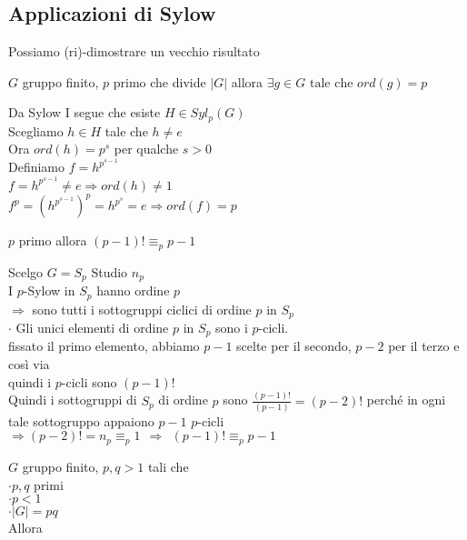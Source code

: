 \documentclass[12px]{article}
\begin{document}
\begin{dimo}
	\subsection{Applicazioni di Sylow}
	Possiamo (ri)-dimostrare un vecchio risultato
	\begin{teo}[Cauchy]
		$G$ gruppo finito, $p$ primo che divide $|G|$ allora 
			 $\exists g\in G\text{ tale che } ord(g) = p$
		
	\end{teo}
	\begin{dimo}
		Da Sylow I segue che esiste $H\in Syl_p(G)$ \\
		Scegliamo $h\in H$ tale che  $h\neq e$\\
		Ora  $ord(h) = p^s$ per qualche $s>0$\\
		Definiamo $f = h^{p^{s-1}}$\\
		 $f = h^{p^{s-1}}\neq e \Rightarrow ord(h)\neq 1$ \\
		 $f^p = (h^{p^{s-1}})^p = h^{p^s} = e \Rightarrow ord(f) = p$
	\end{dimo}
	\begin{teo}[Wilson]
		$p$ primo allora $(p-1)!\equiv_p p-1$
	\end{teo}
	\begin{dimo}
		Scelgo $G= S_p$ Studio $n_p$\\
		I  $p$-Sylow in $S_p$ hanno ordine $p$\\
		 $ \Rightarrow$ sono tutti i sottogruppi ciclici di ordine $p$ in $S_p$\\
		 $\cdot$ Gli unici elementi di ordine  $p$ in $S_p$ sono i $p$-cicli.\\
		 fissato il primo elemento, abbiamo $p-1$ scelte per il secondo, $p-2$ per il terzo e così via\\
		 quindi i $p$-cicli sono $ (p-1)!$\\
		 Quindi i sottogruppi di $S_p$ di ordine $p$ sono $\frac{(p-1)!}{(p-1)} = (p-2)!$ perché in ogni tale sottogruppo appaiono  $p-1$ $p$-cicli\\
		 $ \Rightarrow (p-2)! = n_p \equiv_p 1 \ \ \Rightarrow \ \ (p-1)! \equiv_p p-1$
	\end{dimo}
	\begin{teo}
		$G$ gruppo finito, $p,q > 1$ tali che \\
		 $\cdot p,q$ primi\\
		 $\cdot p < 1$\\
		  $\cdot|G| = pq$ \\
		  Allora\\

\end{teo}
\end{dimo}
\end{document}
